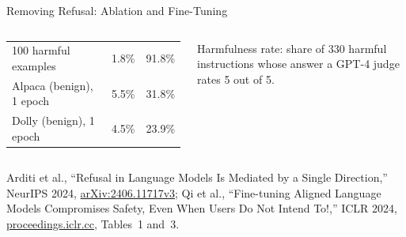 \begin{frame}{Removing Refusal: Ablation and Fine-Tuning}
\begin{columns}[T,onlytextwidth]
{\begin{tabular}{p{3.0cm} p{0.9cm} p{0.9cm}}
        100 harmful examples & 1.8\% & 91.8\% \\
        Alpaca (benign), 1 epoch & 5.5\% & 31.8\% \\
        Dolly (benign), 1 epoch & 4.5\% & 23.9\% \\
        \bottomrule
      \end{tabular}\par}
      \vspace{0.1em}
      {\scriptsize Harmfulness rate: share of 330 harmful instructions whose answer a GPT-4 judge rates 5 out of 5.\par}
  \end{columns}
  \vspace{0.1em}
  {\scriptsize Arditi et al., ``Refusal in Language Models Is Mediated by a Single Direction,'' NeurIPS 2024, \href{https://arxiv.org/abs/2406.11717v3}{arXiv:2406.11717v3}; Qi et al., ``Fine-tuning Aligned Language Models Compromises Safety, Even When Users Do Not Intend To!,'' ICLR 2024, \href{https://proceedings.iclr.cc/paper_files/paper/2024/hash/83b7da3ed13f06c13ce82235c8eedf35-Abstract-Conference.html}{proceedings.iclr.cc}, Tables~1 and~3.}
\end{frame}

